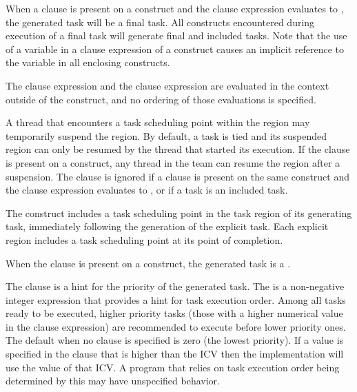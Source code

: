 When a  clause is present on a  construct and the  clause expression 
evaluates to , the generated task will be a final task. All  constructs 
encountered during execution of a final task will generate final and included tasks. Note 
that the use of a variable in a  clause expression of a  construct causes an 
implicit reference to the variable in all enclosing constructs.

The  clause expression and the  clause expression are evaluated in the context 
outside of the  construct, and no ordering of those evaluations is specified.

A thread that encounters a task scheduling point within the  region may 
temporarily suspend the  region. By default, a task is tied and its suspended  
region can only be resumed by the thread that started its execution. If the  
clause is present on a  construct, any thread in the team can resume the  
region after a suspension. The  clause is ignored if a  clause is present 
on the same  construct and the  clause expression evaluates to , or if a 
task is an included task.

The  construct includes a task scheduling point in the task region of its generating 
task, immediately following the generation of the explicit task. Each explicit  
region includes a task scheduling point at its point of completion. 

When the  clause is present on a  construct, the generated task is a . 

The  clause is a hint for the priority of the generated task. The  is a
non-negative integer expression that provides a hint for task execution order. Among all
tasks ready to be executed, higher priority tasks (those with a higher numerical value in the
 clause expression) are recommended to execute before lower priority ones. The default
 when no  clause is specified is zero (the lowest priority). If a value is
specified in the  clause that is higher than the  ICV then the
implementation will use the value of that ICV. A program that relies on task execution order
being determined by this  may have unspecified behavior.

